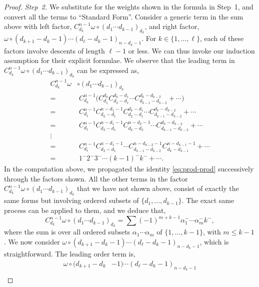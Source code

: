 \documentclass[5p,twocolumn]{elsarticle}
\begin{document}
\begin{proof}
  \emph{Step~2.} We substitute for the weights shown in the formula in Step~1, and convert all the terms to ``Standard Form''.
  Consider a generic term in the sum above with left factor, $C^{n-1}_{d_k}\omega\circ(d_1\cdots d_{k-1})_{d_k}$, and right factor, $\omega\circ(d_{k+1}-d_k-1)\cdots(d_\ell-d_k-1)_{n-d_k-1}$.
  For $k\in\{1,\ldots,\ell\}$, each of these factors involve descents of length $\ell-1$ or less. We can thus invoke our induction assumption for their explicit formulae.
  We observe that the leading term in $C^{n-1}_{d_k}\omega\circ(d_1\cdots d_{k-1})_{d_k}$ can be expressed as,
  \begin{align*}
    C_{d_k}^{n-1}\omega&\circ(d_1\cdots d_{k-1})_{d_k}\\
                     =&\;C_{d_k}^{n-1}\bigl(C_{d_1}^{d_k}C_{d_2-d_1}^{d_k-d_1}\cdots C_{d_{k-1}-d_{k-2}}^{d_k-d_{k-2}}+\cdots\bigr)\\
                     =&\;C_{d_1}^{n-1}C_{d_k-d_1}^{n-d_1-1}C_{d_2-d_1}^{d_k-d_1}\cdots C_{d_{k-1}-d_{k-2}}^{d_k-d_{k-2}}+\cdots\\
                     =&\;C_{d_1}^{n-1}C_{d_2-d_1}^{n-d_1-1}C_{d_k-d_2}^{n-d_2-1}\cdots C_{d_{k-1}-d_{k-2}}^{d_k-d_{k-2}}+\cdots\\
                     \vdots&\\
                     =&\;C_{d_1}^{n-1}C_{d_2-d_1}^{n-d_1-1}\cdots C_{d_{k-1}-d_{k-2}}^{n-d_{k-2}-1}C_{d_{k}-d_{k-1}}^{n-d_{k-1}-1}+\cdots\\
                     =&\;1^-2^-3^-\cdots(k-1)^-k^-+\cdots.
  \end{align*}
  In the computation above, we propagated the identity \eqref{eq:prod-prod} successively through the factors shown. 
  All the other terms in the factor $C^{n-1}_{d_k}\omega\circ(d_1\cdots d_{k-1})_{d_k}$ that we have not shown above,
  consist of exactly the same forms but involving ordered subsets of $\{d_1,\ldots,d_{k-1}\}$.
  The exact same process can be applied to them, and we deduce that,
  \begin{equation*}
    C^{n-1}_{d_k}\omega\circ(d_1\cdots d_{k-1})_{d_k}=\sum(-1)^{m+k-1}\alpha_1^-\cdots\alpha_m^-k^-,
  \end{equation*}
  where the sum is over all ordered subsets $\alpha_1\cdots\alpha_m$ of $\{1,\ldots,k-1\}$, with $m\leqslant k-1$. 
  We now consider $\omega\circ(d_{k+1}-d_k-1)\cdots(d_\ell-d_k-1)_{n-d_k-1}$, which is straightforward.
  The leading order term is,
  \begin{align*}
    \omega\circ(d_{k+1}-d_k&-1)\cdots(d_\ell-d_k-1)_{n-d_k-1}\\

\end{align*}
\end{proof}
\end{document}
